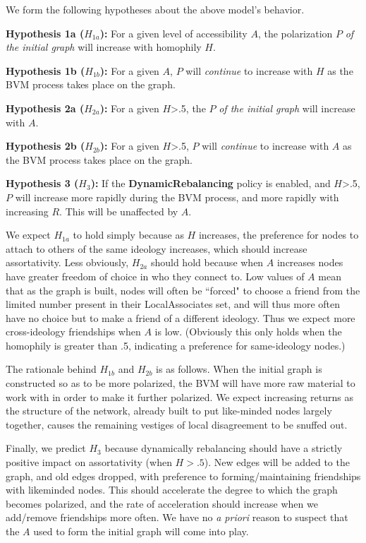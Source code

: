 
\label{sec:hypos}

We form the following hypotheses about the above model's behavior.

\begin{description}

\item{\textbf{Hypothesis 1a ($H_{1a}$):}} For a given level of accessibility
$A$, the polarization $P$ \textit{of the initial graph} will increase with
homophily $H$.

\item{\textbf{Hypothesis 1b ($H_{1b}$):}} For a given $A$, $P$ will
\textit{continue} to increase with $H$ as the BVM process takes place on the
graph.

\item{\textbf{Hypothesis 2a ($H_{2a}$):}} For a given $H$>.5, the $P$ \textit{of
the initial graph} will increase with $A$.

\item{\textbf{Hypothesis 2b ($H_{2b}$):}} For a given $H$>.5, $P$ will
\textit{continue} to increase with $A$ as the BVM process takes place on the
graph.

\item{\textbf{Hypothesis 3 ($H_3$):}} If the \textbf{DynamicRebalancing}
policy is enabled, and $H$>.5, $P$ will increase more rapidly during the BVM
process, and more rapidly with increasing $R$. This will be unaffected by $A$.

\end{description}

We expect $H_{1a}$ to hold simply because as $H$ increases, the preference for
nodes to attach to others of the same ideology increases, which should
increase assortativity. Less obviously, $H_{2a}$ should hold because when $A$
increases nodes have greater freedom of choice in who they connect to. Low
values of $A$ mean that as the graph is built, nodes will often be ``forced"
to choose a friend from the limited number present in their LocalAssociates
set, and will thus more often have no choice but to make a friend of a
different ideology. Thus we expect more cross-ideology friendships when $A$ is
low. (Obviously this only holds when the homophily is greater than .5,
indicating a preference for same-ideology nodes.)

The rationale behind $H_{1b}$ and $H_{2b}$ is as follows. When the initial
graph is constructed so as to be more polarized, the BVM will have more raw
material to work with in order to make it further polarized. We expect
increasing returns as the structure of the network, already built to put
like-minded nodes largely together, causes the remaining vestiges of local
disagreement to be snuffed out.

Finally, we predict $H_3$ because dynamically rebalancing should have a
strictly positive impact on assortativity (when $H>.5$). New edges will be
added to the graph, and old edges dropped, with preference to
forming/maintaining friendships with likeminded nodes. This should accelerate
the degree to which the graph becomes polarized, and the rate of acceleration
should increase when we add/remove friendships more often. We have no
\textit{a priori} reason to suspect that the $A$ used to form the initial
graph will come into play.
